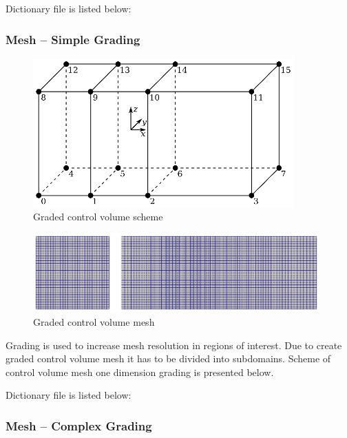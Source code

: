 Dictionary file is listed below:
\begin{codelistdict}
  
\end{codelistdict}

\subsubsection{Mesh -- Simple Grading}

\begin{figure}[h!]
  \centering
  \includegraphics[width=100mm]{images/openfoam_control_volume_2_1.eps}
  \caption{Graded control volume scheme}
\end{figure}

\begin{figure}[h!]
  \centering
  \includegraphics[width=110mm]{images/openfoam_control_volume_2_1_para.eps}
  \caption{Graded control volume mesh}
\end{figure}

Grading is used to increase mesh resolution in regions of interest. Due to create graded control volume mesh it has to be divided into subdomains. Scheme of control volume mesh one dimension grading is presented below.

Dictionary file is listed below:
\begin{codelistdict}
  
\end{codelistdict}

\subsubsection{Mesh -- Complex Grading}

